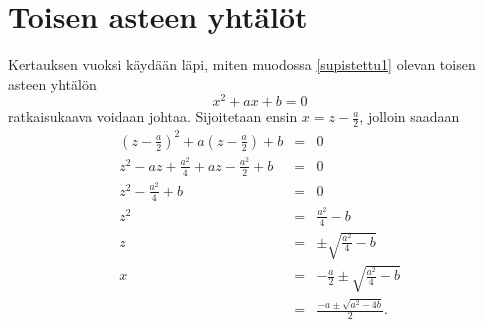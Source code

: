 \documentclass[a4paper]{article}
\begin{document}
\section{Toisen asteen yhtälöt}
Kertauksen vuoksi käydään läpi, miten muodossa \ref{supistettu1} olevan toisen asteen yhtälön
$$
x^2+ax+b=0
$$
ratkaisukaava voidaan johtaa. Sijoitetaan ensin $x=z-\frac{a}{2}$, jolloin saadaan
\begin{eqnarray*}
  \left(z-\frac{a}{2}\right)^2+a\left(z-\frac{a}{2}\right)+b & = & 0 \\
  z^2-az+\frac{a^2}{4}+az-\frac{a^2}{2}+b & = & 0 \\
  z^2-\frac{a^2}{4}+b & = & 0 \\
  z^2 & = & \frac{a^2}{4}-b \\
  z & = & \pm\sqrt{\frac{a^2}{4}-b} \\
  x & = & -\frac{a}{2}\pm\sqrt{\frac{a^2}{4}-b} \\
  & = & \frac{-a\pm\sqrt{a^2-4b}}{2}.
\end{eqnarray*}
\end{document}
